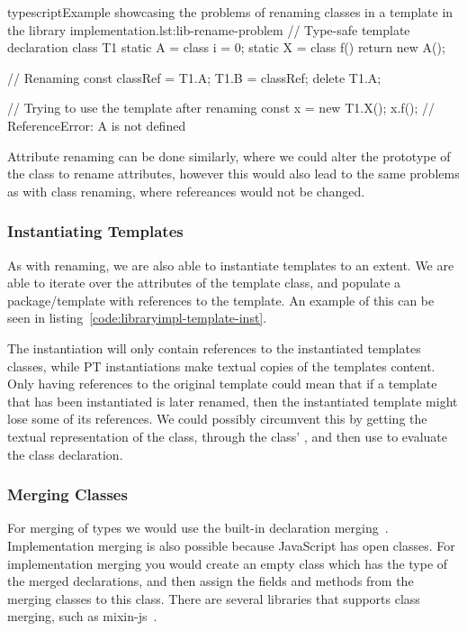 \begin{code}{typescript}{Example showcasing the problems of renaming classes in a template in the library implementation.}{lst:lib-rename-problem}
    // Type-safe template declaration
    class T1 {
        static A = class {
            i = 0;
        }
        static X = class {
            f() {
                return new A();
            }
        }
    }

   // Renaming
    const classRef = T1.A;
    T1.B = classRef;
    delete T1.A;

    // Trying to use the template after renaming
    const x = new T1.X();
    x.f(); // ReferenceError: A is not defined
\end{code}

Attribute renaming can be done similarly, where we could alter the prototype of the class to rename attributes, however this would also lead to the same problems as with class renaming, where refereances would not be changed.

\subsubsection{Instantiating Templates}\label{subsubsec:instantiating-templates}

As with renaming, we are also able to instantiate templates to an extent.
We are able to iterate over the attributes of the template class, and populate a package/template with references to the template.
An example of this can be seen in listing~\vref{code:libraryimpl-template-inst}.


The instantiation will only contain references to the instantiated templates classes, while PT instantiations make textual copies of the templates content.
Only having references to the original template could mean that if a template that has been instantiated is later renamed, then the instantiated template might lose some of its references.
We could possibly circumvent this by getting the textual representation of the class, through the class' , and then use  to evaluate the class declaration.

\subsubsection{Merging Classes}

For merging of types we would use the built-in declaration merging~\cite{declerationmerging}.
Implementation merging is also possible because JavaScript has open classes.
For implementation merging you would create an empty class which has the type of the merged declarations, and then assign the fields and methods from the merging classes to this class.
There are several libraries that supports class merging, such as mixin-js~\cite{mixinjs}.

